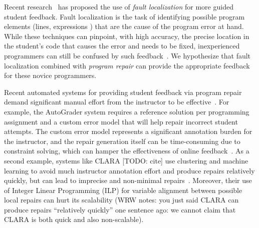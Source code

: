 Recent research~\citep[][]{Seidel:2017, Zhang2014-lv} has proposed the use of
\emph{fault localization} for more guided student feedback. Fault localization is the
task of identifying possible program elements (\eg lines, expressions \etc) that
are the cause of the program error at hand. While these techniques can pinpoint,
with high accuracy, the precise location in the student's code that causes the
error and needs to be fixed, inexperienced programmers can still be confused by
such feedback~\cite{FIXME}. We hypothesize that fault localization combined with
\emph{program repair}
can provide the appropriate feedback for these novice programmers.

Recent automated systems for providing student feedback via program repair
demand significant manual effort from the instructor to be
effective~\cite{FIXME}. For example, the AutoGrader system requires a
reference solution per programming assignment and a custom error model that
will help
repair incorrect student attempts. The custom error model represents a
significant annotation burden for the instructor, and the repair generation
itself can be time-consuming due to constraint solving, which can hamper
the effectiveness of online feedback~\cite{FIXME}. 
As a second example, systems like CLARA [TODO: cite] use
clustering and machine learning to avoid much instructor annotation effort
and produce repairs relatively quickly, but can 
lead to
imprecise and non-minimal repairs~\cite{FIXME}. 
Moreover, their use of Integer Linear
Programming (ILP) for variable alignment between possible local repairs can hurt
its scalability (WRW notes: you just said CLARA can produce repairs
``relatively quickly'' one sentence ago: we cannot claim that CLARA is both
quick and also non-scalable). 

